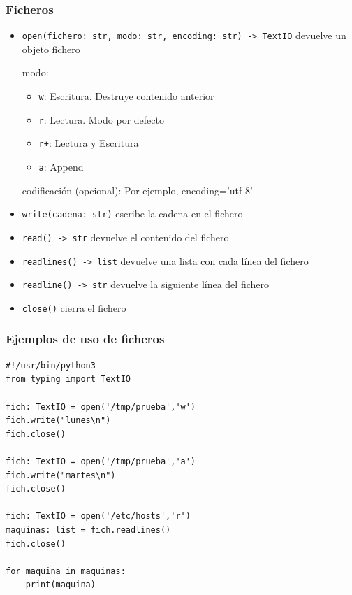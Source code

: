 \begin{frame}[fragile]
\frametitle{Ficheros}
\begin{itemize}
  
\item \verb|open(fichero: str, modo: str, encoding: str) -> TextIO|
devuelve un objeto fichero

modo:
\begin{itemize}
  
\item \verb|w|: Escritura. Destruye contenido anterior
\item \verb|r|: Lectura. Modo por defecto
\item \verb|r+|: Lectura y Escritura
\item \verb|a|: Append

\end{itemize}

codificación (opcional): Por ejemplo, encoding='utf-8'

\item \verb|write(cadena: str)| escribe la cadena en el fichero  
\item \verb|read() -> str| devuelve el contenido del fichero
\item \verb|readlines() -> list| devuelve una lista con cada línea del fichero
\item \verb|readline() -> str| devuelve la siguiente línea del fichero
\item \verb|close()| cierra el fichero

\end{itemize}
\end{frame}


\begin{frame}[fragile]
\frametitle{Ejemplos de uso de ficheros}

\begin{footnotesize}
\begin{verbatim}
#!/usr/bin/python3
from typing import TextIO

fich: TextIO = open('/tmp/prueba','w')
fich.write("lunes\n")
fich.close()

fich: TextIO = open('/tmp/prueba','a')
fich.write("martes\n")
fich.close()

fich: TextIO = open('/etc/hosts','r')
maquinas: list = fich.readlines()
fich.close()

for maquina in maquinas:
    print(maquina)

\end{verbatim}
\end{footnotesize}
\end{frame}



